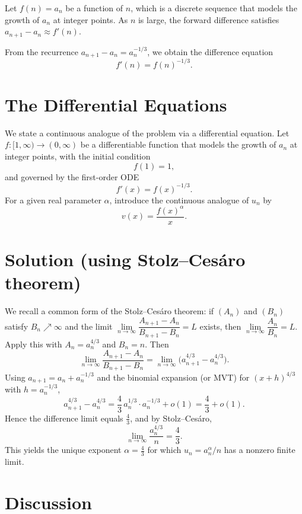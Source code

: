 \documentclass{article}
\begin{document}
Let $f(n) = a_n$ be a function of $n$, which is a discrete sequence that models the growth of $a_n$ at integer points.
As $n$ is large, the forward difference satisfies $a_{n+1} - a_n \approx f'(n)$.

From the recurrence $a_{n+1} - a_n = a_n^{-1/3}$, we obtain the difference equation
$$ f'(n) = f(n)^{-1/3}. $$

\section{The Differential Equations}
We state a continuous analogue of the problem via a differential equation. Let $f\colon [1,\infty) \to (0,\infty)$ be a differentiable function that models the growth of $a_n$ at integer points, with the initial condition
$$ f(1) = 1, $$
and governed by the first-order ODE
$$ f'(x) = f(x)^{-1/3}. $$
For a given real parameter $\alpha$, introduce the continuous analogue of $u_n$ by
$$ v(x) = \frac{f(x)^\alpha}{x}. $$

\section{Solution (using Stolz--Ces\'aro theorem)}
We recall a common form of the Stolz--Ces\'aro theorem: if $(A_n)$ and $(B_n)$ satisfy $B_n\nearrow \infty$ and the limit $\lim\limits_{n\to\infty}\dfrac{A_{n+1}-A_n}{B_{n+1}-B_n}=L$ exists, then $\lim\limits_{n\to\infty}\dfrac{A_n}{B_n}=L$.
Apply this with $A_n=a_n^{4/3}$ and $B_n=n$. Then
$$\lim_{n\to\infty}\frac{A_{n+1}-A_n}{B_{n+1}-B_n}=\lim_{n\to\infty}\big(a_{n+1}^{4/3}-a_n^{4/3}\big).$$
Using $a_{n+1}=a_n+a_n^{-1/3}$ and the binomial expansion (or MVT) for $(x+h)^{4/3}$ with $h=a_n^{-1/3}$,
$$a_{n+1}^{4/3}-a_n^{4/3}=\frac{4}{3}\,a_n^{1/3}\cdot a_n^{-1/3}+o(1)=\frac{4}{3}+o(1).$$
Hence the difference limit equals $\tfrac{4}{3}$, and by Stolz--Ces\'aro,
$$\lim_{n\to\infty}\frac{a_n^{4/3}}{n}=\frac{4}{3}.$$
This yields the unique exponent $\alpha=\tfrac{4}{3}$ for which $u_n=a_n^\alpha/n$ has a nonzero finite limit.

\section{Discussion}
\end{document}

